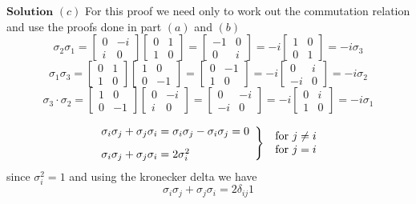 \documentclass{article}
\begin{document}
\begin{flushleft}
$\boxed{\textbf{Solution}}$  $(c)$ For this proof we need only to work out the commutation relation and use the proofs done in part $(a)$ and $(b)$
$$\sigma_{2} \sigma_{1}=\begin{bmatrix}{0} & {-i} \\ {i} & {0}\end{bmatrix}\begin{bmatrix}{0} & {1} \\ {1} & {0}\end{bmatrix}=\begin{bmatrix}{-1} & {0} \\ {0} & {i}\end{bmatrix}=-i\begin{bmatrix}{1} & {0} \\ {0} & {1}\end{bmatrix} = -i\sigma_3$$
$$\sigma_{1} \sigma_{3}=\begin{bmatrix}{0} & {1} \\ {1} & {0}\end{bmatrix}\begin{bmatrix}{1} & {0} \\ {0} & {-1}\end{bmatrix}=\begin{bmatrix}{0} & {-1} \\ {1} & {0}\end{bmatrix}=-i\begin{bmatrix}{0} & {i} \\ {-i} & {0}\end{bmatrix}=-i \sigma_{2}$$
$$\sigma_{3} \cdot \sigma_{2}=\begin{bmatrix}{1} & {0} \\ {0} & {-1}\end{bmatrix}\begin{bmatrix}{0} & {-i} \\ {i} & {0}\end{bmatrix}=\begin{bmatrix}{0} & {-i} \\ {-i} & {0}\end{bmatrix}=-i\begin{bmatrix}{0} & {i} \\ {1} & {0}\end{bmatrix} = -i\sigma_1$$

$$\left.\begin{array}{l}{\sigma_{i} \sigma_{j}+\sigma_{j} \sigma_{i}=\sigma_{i} \sigma_{j}-\sigma_{i} \sigma_{j}=0} \vspace{3mm} \\ {\sigma_{i} \sigma_{j}+\sigma_{j} \sigma_{i}=2 \sigma_{i}^{2}}\end{array}\right\} \begin{array}{l}{\text { for } j \neq i} \\ {\text { for } j=i}\end{array}$$
since $\sigma_{i}^{2}=1$ and using the kronecker delta we have
$$\sigma_{i} \sigma_{j}+\sigma_{j} \sigma_{i}=2 \delta_{i j} 1$$



\end{flushleft}
\end{document}
